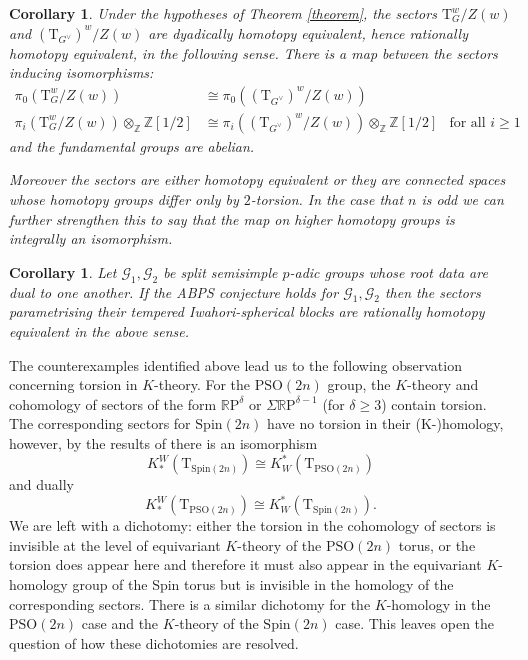 \documentclass[11pt,a4paper]{article}
\newtheorem{corollary}[theorem]{Corollary}
\def\Spin{\mathrm{Spin}}
\def\PSO{\mathrm{PSO}}
\def\R{\mathbb{R}}
\def\Z{\mathbb{Z}}
\def\RP{\R\mathrm{P}}
\def\bT{\mathrm{T}}
\def\G{\mathcal{G}}
\begin{document}
\begin{corollary}\label{corollary} Under the hypotheses of Theorem \ref{theorem}, the sectors $\bT_G^w/Z(w)$ and $(\bT_{G^\vee})^w/Z(w)$ are dyadically homotopy equivalent, hence rationally homotopy equivalent, in the following sense. There is a map between the sectors inducing isomorphisms:
\begin{align*}
\pi_0(\bT_G^w/Z(w))&\cong \pi_0((\bT_{G^\vee})^w/Z(w))\\
\pi_i(\bT_G^w/Z(w)) \otimes_\Z \Z[1/2] &\cong \pi_i((\bT_{G^\vee})^w/Z(w))\otimes_\Z \Z[1/2]&\text{for all }i\geq 1
\end{align*}
and the fundamental groups are abelian.

Moreover the sectors are either homotopy equivalent or they are connected spaces whose homotopy groups differ only by $2$-torsion.  In the case that $n$ is odd we can further strengthen this to say that the map on higher homotopy groups is integrally an isomorphism. 
\end{corollary}

\begin{corollary}
    Let $\G_1,\G_2$ be  split semisimple $p$-adic groups whose root data are dual to one another. If the ABPS conjecture \cite[\S15]{ABPS-smooth-dual} holds for $\G_1, \G_2$ then  the sectors parametrising their tempered Iwahori-spherical blocks are rationally homotopy equivalent in the above sense. 
\end{corollary}



\bigskip


The counterexamples identified above lead us to the following observation concerning torsion in $K$-theory. For the $\PSO(2n)$ group, the $K$-theory and cohomology of sectors of the form $\RP^\delta$ or $\Sigma \RP^{\delta-1}$ (for $\delta \geq 3$) contain torsion.  The corresponding sectors for $\Spin(2n)$ have no torsion in their (K-)homology, however, by the results of \cite{NPWKdual} there is an isomorphism
\[
  K_*^W(\bT_{\Spin(2n)}) \cong K^*_W(\bT_{\PSO(2n)})
\]
  and dually
  \[
  K_*^W(\bT_{\PSO(2n)})\cong K^*_W(\bT_{\Spin(2n)}).
  \]
We are left with a dichotomy: either the torsion in the cohomology of sectors is invisible at the level of equivariant $K$-theory of the $\PSO(2n)$ torus, or the torsion does appear here and therefore it must also appear in the equivariant $K$-homology group of the Spin torus but is invisible in the homology of the corresponding sectors. There is a similar dichotomy for the $K$-homology in the $\PSO(2n)$ case and the $K$-theory of the $\Spin(2n)$ case.  This leaves open the question of how these dichotomies are resolved.
\end{document}
